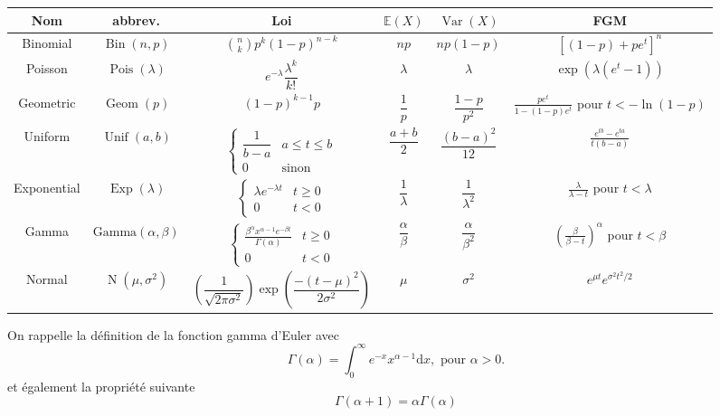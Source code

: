 \documentclass[11pt,addpoints, answers]{exam}
\def\Bin{\operatorname{Bin}}
\def\Var{\operatorname{Var}}
\def\Geom{\operatorname{Geom}}
\def\Pois{\operatorname{Pois}}
\def\Exp{\operatorname{Exp}}
\def\Unif{\operatorname{Unif}}
\def\No{\operatorname{N}}
\newcommand{\E}{\mathbb E}            %
\def\Var{\operatorname{Var}}
\begin{document}
\renewcommand\arraystretch{3.5}
\begin{table}[H]
\begin{center}
\footnotesize
\begin{tabular}{|c|c|c|c|c|c|}

\hline
Nom & abbrev. & Loi & $\E(X)$ & $\Var(X)$ & FGM\\
\hline\hline
Binomial & $\Bin(n,p)$ & $\binom{n}{k}p^k(1-p)^{n-k}$ & $np$ & $np(1-p)$ & $[(1-p)+pe^t]^n$\\
\hline
Poisson & $\Pois(\lambda)$ & $e^{-\lambda}\dfrac{\lambda^k}{k!}$ & $\lambda$ & $\lambda$ &$ \exp(\lambda(e^t-1))$\\
\hline
Geometric & $\Geom(p)$ & $(1-p)^{k-1}p$ & $\dfrac{1}{p}$ & $\dfrac{1-p}{p^2}$ & $\frac{pe^t}{1-(1-p)e^t}$ pour  $t<-\ln(1-p)$\\
\hline
Uniform & $\Unif(a,b)$ & $\begin{cases} \dfrac{1}{b-a} & a\leq t\leq b\\ 0 & \text{sinon}\end{cases}
$ & $\dfrac{a+b}{2}$ & $\dfrac{(b-a)^2}{12}$ & $\frac{e^{tb}-e^{ta}}{t(b-a)}$\\
\hline
Exponential & $\Exp(\lambda)$ & $\begin{cases} \lambda e^{-\lambda t} & t\geq 0 \\ 0 & t<0\end{cases}$ & $\dfrac{1}{\lambda}$ & $\dfrac{1}{\lambda^2}$ & $\frac{\lambda}{\lambda -t}$ pour $t<\lambda$\\
\hline
Gamma & $\text{Gamma}(\alpha,\beta)$ & $\begin{cases} \frac{\beta^\alpha x^{\alpha-1}e^{-\beta t}}{\Gamma(\alpha)} & t\geq 0 \\ 0 & t<0\end{cases}$ & $\dfrac{\alpha}{\beta}$ & $\dfrac{\alpha}{\beta^2}$ & $\left(\frac{\beta}{\beta -t}\right)^\alpha$ pour $t<\beta$\\
\hline
Normal & $\No(\mu,\sigma^2)$ & $\left(\dfrac{1}{\sqrt{2\pi\sigma^2}}\right)\operatorname{exp}{\left(\dfrac{-(t-\mu)^2}{2\sigma^2}\right)}$ & $\mu$ & $\sigma^2$ & $e^{\mu t}e^{\sigma^2t^2/2}$\\
\hline
\end{tabular}
\end{center}
\end{table}
On rappelle la définition de la fonction gamma d'Euler avec 
$$
\Gamma(\alpha) = \int_{0}^\infty e^{-x}x^{\alpha-1}\text{d}x,\text{ pour }\alpha>0.
$$
et également la propriété suivante
$$
\Gamma(\alpha+1) = \alpha\Gamma(\alpha)
$$
% 
% 
\end{document}

